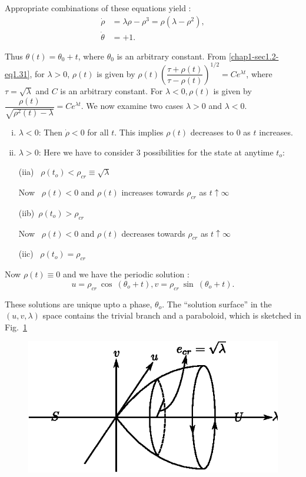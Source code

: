 Appropriate combinations of these equations yield : 
\begin{align}
\dot{\rho} &= \lambda\rho - \rho^{3} = \rho(\lambda -
\rho^{2}),\tag{1.31}\label{chap1-sec1.2-eq1.31}\\ 
\dot{\theta} &= +1.\tag{1.32}\label{chap1-sec1.2-eq1.32}  
\end{align}


Thus  $\theta (t) = \theta_0 + t$, where $\theta_{0}$ is an arbitrary
constant. From \eqref{chap1-sec1.2-eq1.31}, for $\lambda > 0$, $\rho
(t)$ is given by $\rho 
(t) (\dfrac{\tau + \rho(t)}{\tau - \rho(t)})^{1/2} = Ce^{\lambda t}$,
where $\tau = \sqrt{\lambda}$ and $C$ is an arbitrary constant. For
$\lambda < 0, \rho (t)$ is given by $\dfrac{\rho(t)}{\sqrt{\rho^{2}(t)
    - \lambda}} = Ce^{\lambda t}$.  We now examine two cases $\lambda
> 0$ and $\lambda < 0$.   
\begin{enumerate}[(i)]
\item $\lambda < 0$: Then $\dot{\rho} < 0$ for all $t$. This implies
  $\rho(t)$ decreases to 0 as $t$ increases.  

\item $\lambda > 0$: Here we have to consider 3 possibilities for
  the state at any\pageoriginale time $t_{o}$:  

(iia)~ $\rho(t_{o}) < \rho_{cr} \equiv \sqrt{\lambda}$

Now~ $\rho(t) < 0$ and $\rho (t)$ increases towards $\rho_{cr}$ as $t
\uparrow \infty$ 

(iib)~$\rho(t_{o}) > \rho_{cr}$

Now~ $\rho(t) < 0$ and $\rho (t)$ decreases towards $\rho_{cr}$ as $t
\uparrow \infty$ 

(iic)~ $\rho(t_{o}) = \rho_{cr}$
\end{enumerate}

Now $\rho(t) \equiv 0 $ and we have the periodic solution :
$$
u = \rho_{cr} ~\cos~ (\theta_{o} + t), v = \rho_{cr} ~\sin~ (\theta_{o} + t).
$$

These solutions are unique upto a phase, $\theta_{o}$. The ``solution
surface'' in the $(u, v, \lambda)$ space contains the trivial branch and
a paraboloid, which is sketched in Fig.~\ref{chap1-sec1.2-fig1.13} 
\begin{figure}[H]
\centering
\includegraphics{vol79-fig/fig79-13.eps}
\smallskip
\caption{}
\label{chap1-sec1.2-fig1.13}
\end{figure}

